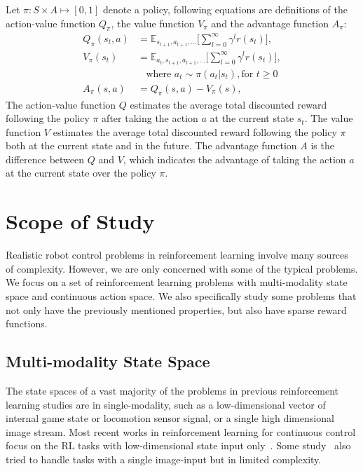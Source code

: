 Let $\pi : S \times A \mapsto [0,1] $ denote a policy, following equations are definitions of the action-value function $Q_\pi $, the value function $V_\pi $ and the advantage function $A_\pi $:
\begin{align}
Q_\pi(s_t,a) &= \mathbb{E}_{s_{t+1},a_{t+1},\ldots}
\big[ \sum_{l=0}^\infty \gamma^l r(s_{t}) \big], \\
V_\pi(s_t) &= \mathbb{E}_{a_{t},s_{t+1},a_{t+1},\ldots}
\big[ \sum_{l=0}^\infty \gamma^l  r(s_{t}) \big],\\
& \ \ \ \ \text{where } a_t \sim \pi (a_t|s_t), \text{for } t \geq 0  \\
A_\pi (s,a) &= Q_\pi (s,a) - V_\pi (s), 
\end{align}
The action-value function $Q$ estimates the average total discounted reward following the policy $\pi$ after taking the action $a$ at the current state $s_t$. The value function $V$ estimates the average total discounted reward following the policy $\pi$ both at the current state and in the future. The advantage function $A$ is the difference between $Q$ and $V$, which indicates the advantage of taking the action $a$ at the current state over the policy $\pi$.




\section{Scope of Study}
Realistic robot control problems in reinforcement learning involve many sources of complexity. However, we are only concerned with some of the typical problems.
We focus on a set of reinforcement learning problems with multi-modality state space and continuous action space. We also specifically study some problems that not only have the previously mentioned properties, but also have sparse reward functions.

\subsection{Multi-modality State Space}

The state spaces of a vast majority of the problems in previous reinforcement learning studies are in single-modality, such as a low-dimensional vector of internal game state or locomotion sensor signal, or a single high dimensional image stream. Most recent works in reinforcement learning for continuous control focus on the RL tasks with low-dimensional state input only~\cite{duan2016benchmarking}. Some study~\cite{wu2017scalable} also tried to handle tasks with a single image-input but in limited complexity.

